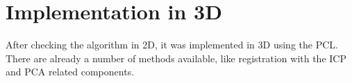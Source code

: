 \chapter{Implementation in 3D}

After checking the algorithm in 2D, it was implemented in 3D using the PCL. There are already a number of methods available, like registration with the ICP and PCA related components.